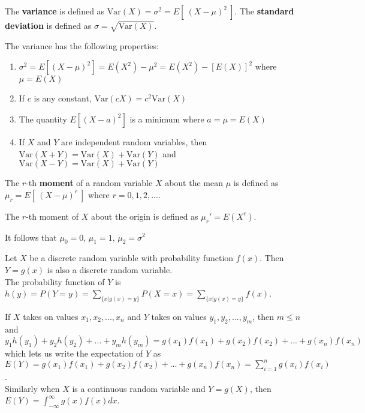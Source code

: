 \begin{defn}
    The \textbf{variance} is defined as $\text{Var} (X) = \sigma ^2 = E[ \  (X - \mu)^2 \  ]$.
    The \textbf{standard deviation} is defined as $\sigma = \sqrt{\text{Var} (X)}$.
\end{defn}

\begin{samepage}
\begin{thm}
    The variance has the following properties:

    \begin{enumerate}
        \item $\sigma ^2 = E\left [ \left (X - \mu \right ) ^2 \right ] = E\left (X ^2\right ) - \mu ^2 = E\left (X ^2\right ) - \left [E\left (X\right )\right ] ^2$ where $\mu = E\left (X\right )$
        \item If $c$ is any constant, $\text{Var}(cX) = c^2 \text{Var}(X)$
        \item The quantity $E[ (X - a)^2 ]$ is a minimum where $a = \mu = E(X)$
        \item If $X$ and $Y$ are independent random variables, then \\ $\text{Var}(X+Y) = \text{Var}(X) + \text{Var}(Y)$ and $\text{Var}(X-Y) = \text{Var}(X) + \text{Var}(Y)$
    \end{enumerate}
\end{thm}
\end{samepage}

\begin{defn}
    The $r$-th \textbf{moment} of a random variable $X$ about the mean $\mu$ is defined as $\mu_r = E[\  (X - \mu)^r \ ]$ where $r=0, 1, 2, ...$.

    The $r$-th moment of $X$ about the origin is defined as $\mu_r ' = E(X^r)$.
\end{defn}

It follows that $\mu_0 = 0$, $\mu_1 = 1$, $\mu_2 = \sigma ^2$

\begin{samepage}
\begin{thm}
    Let $X$ be a discrete random variable with probability function $f(x)$. Then $Y = g(x)$ is also a discrete random variable. \\ The probability function of $Y$ is $h(y) = P(Y = y) = \sum_{ \{x | g(x) = y \} } P(X = x) = \sum_{ \{x | g(x) = y \} } f(x)$.

    If $X$ takes on values $x_1, x_2, ..., x_n$  and $Y$ takes on values $y_1, y_2, ..., y_m$, then $m \leq n$ and $y_1 h(y_1) + y_2 h(y_2) + ... + y_m h(y_m) = g(x_1) f(x_1) + g(x_2) f(x_2) + ... + g(x_n) f(x_n)$ which lets us write the expectation of $Y$ as \\ $E(Y) = g(x_1)f(x_1) + g(x_2)f(x_2) + ... + g(x_n)f(x_n) = \sum_{i=1}^n g(x_i)f(x_i)$.
    \\ 

    Similarly when $X$ is a continuous random variable and $Y=g(X)$, then $E(Y) = \int_{- \infty}^{\infty} g(x) f(x) dx$.
\end{thm}
\end{samepage}

